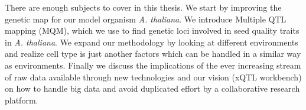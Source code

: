 There are enough subjects to cover in this thesis. We start by improving the genetic map for 
our model organism \emph{A. thaliana}. We introduce Multiple QTL mapping (MQM), which we use 
to find genetic loci involved in seed quality traits in \emph{A. thaliana}. We expand our 
methodology by looking at different environments and realize cell type is just another 
factors which can be handled in a similar way as environments. Finally we discuss the 
implications of the ever increasing stream of raw data available through new technologies and 
our vision (xQTL workbench) on how to handle big data and avoid duplicated effort by a 
collaborative research platform.

